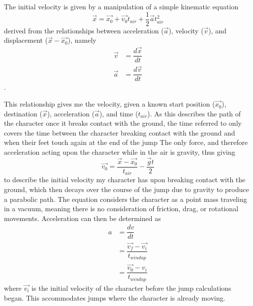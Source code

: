 The initial velocity is given by a manipulation of a simple kinematic equation \[ \vec{x} = \vec{x_0} + \vec{v_0} t_{air} + \frac{1}{2} \vec{a} t_{air}^2 \] derived from the relationships between acceleration ($\vec{a}$), velocity ($\vec{v}$), and displacement ($\vec{x} - \vec{x_0}$), namely
\begin{align*}
	\vec{v} &= \dfrac{d\vec{x}}{dt} \\
	\vec{a} &= \dfrac{d\vec{v}}{dt}
\end{align*}.

This relationship gives me the velocity, given a known start position ($\vec{x_0}$), destination ($\vec{x}$), acceleration ($\vec{a}$), and time ($t_{air}$).  As this describes the path of the character once it breaks contact with the ground, the time referred to only covers the time between the character breaking contact with the ground and when their feet touch again at the end of the jump  The only force, and therefore acceleration acting upon the character while in the air is gravity, thus giving 
\[ \vec{v_0} = \dfrac{\vec{x} - \vec{x_0}}{t_{air}} - \dfrac{\vec{g}t}{2} \]
to describe the initial velocity my character has upon breaking contact with the ground, which then decays over the course of the jump due to gravity to produce a parabolic path.  The equation considers the character as a point mass traveling in a vacuum, meaning there is no consideration of friction, drag, or rotational movements.  Acceleration can then be determined as 
\begin{align*}
	a &= \dfrac{dv}{dt} \\
	&= \dfrac{\vec{v_f} - \vec{v_i}}{t_{windup}} \\
	&= \dfrac{\vec{v_0} - {v_i}}{t_{windup}}
\end{align*}
where $\vec{v_i}$ is the initial velocity of the character before the jump calculations began.  This accommodates jumps where the character is already moving.



